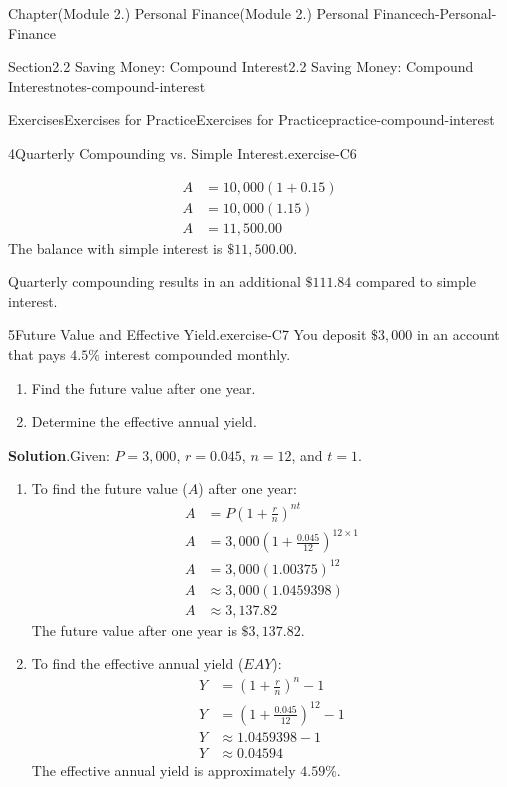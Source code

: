 \documentclass[oneside,10pt,]{book}
\newcommand{\blocktitlefont}{\relax}
\newcommand{\amp}{&}
\begin{document}
\begin{chapterptx}{Chapter}{(Module 2.) Personal Finance}{}{(Module 2.) Personal Finance}{}{}{ch-Personal-Finance}
\begin{sectionptx}{Section}{2.2 Saving Money: Compound Interest}{}{2.2 Saving Money: Compound Interest}{}{}{notes-compound-interest}
\begin{exercises-subsection-numberless}{Exercises}{Exercises for Practice}{}{Exercises for Practice}{}{}{practice-compound-interest}
\begin{divisionexercise}{4}{Quarterly Compounding vs. Simple Interest.}{}{exercise-C6}
\begin{enumerate}[label={\arabic*}]
\begin{align*}
A \amp = 10,000(1 + 0.15)\\
A \amp = 10,000(1.15)\\
A \amp = 11,500.00
\end{align*}
The balance with simple interest is \(\$11,500.00\).%
\end{enumerate}
%
\par
Quarterly compounding results in an additional \(\$111.84\) compared to simple interest.%
\end{divisionexercise}%
\begin{divisionexercise}{5}{Future Value and Effective Yield.}{}{exercise-C7}%
You deposit \(\$3,000\) in an account that pays \(4.5\%\) interest compounded monthly.%
\begin{enumerate}[label={\arabic*}]
\item{}Find the future value after one year.%
\item{}Determine the effective annual yield.%
\end{enumerate}
%
\par\smallskip%
\noindent\textbf{\blocktitlefont Solution}.\hypertarget{exercise-C7-3}{}\quad{}Given: \(P = 3,000\), \(r = 0.045\), \(n = 12\), and \(t = 1\).%
\par
%
\begin{enumerate}[label={\arabic*}]
\item{}To find the future value (\(A\)) after one year:%
\begin{align*}
A \amp = P\left(1 + \frac{r}{n}\right)^{nt}\\
A \amp = 3,000\left(1 + \frac{0.045}{12}\right)^{12 \times 1}\\
A \amp = 3,000(1.00375)^{12}\\
A \amp \approx 3,000(1.0459398)\\
A \amp \approx 3,137.82
\end{align*}
The future value after one year is \(\$3,137.82\).%
\item{}To find the effective annual yield (\(EAY\)):%
\begin{align*}
Y \amp = \left(1 + \frac{r}{n}\right)^n - 1\\
Y \amp = \left(1 + \frac{0.045}{12}\right)^{12} - 1\\
Y \amp \approx 1.0459398 - 1\\
Y \amp \approx 0.04594
\end{align*}
The effective annual yield is approximately \(4.59\%\).%
\end{enumerate}
%
\end{divisionexercise}%

\end{exercises-subsection-numberless}
\end{sectionptx}
\end{chapterptx}
\end{document}
